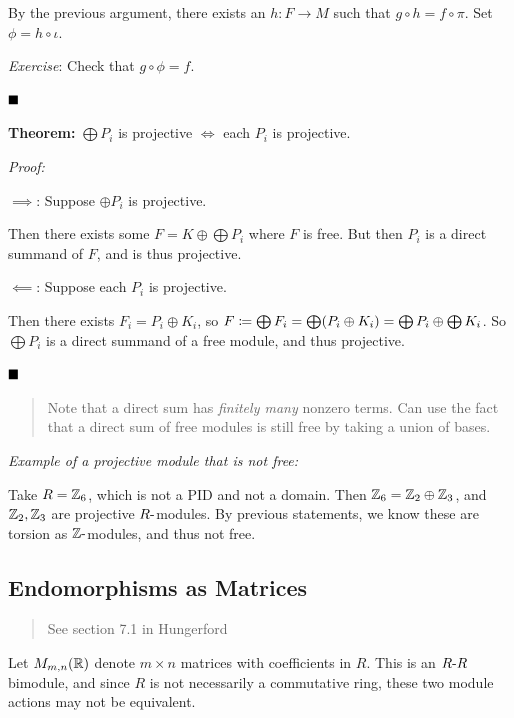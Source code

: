 By the previous argument, there exists an \(h: F\to M\) such that
\(g\circ h = f \circ \pi\). Set \(\phi = h\circ \iota\).

\emph{Exercise}: Check that \(g\circ \phi = f\).

\(\qed\)

\textbf{Theorem:} \(\bigoplus P_i\) is projective \(\iff\) each \(P_i\)
is projective.

\emph{Proof:}

\(\implies\): Suppose \(\oplus P_i\) is projective.

Then there exists some \(F = K \oplus \bigoplus P_i\) where \(F\) is
free. But then \(P_i\) is a direct summand of \(F\), and is thus
projective.

\(\impliedby\): Suppose each \(P_i\) is projective.

Then there exists \(F_i = P_i \oplus K_i\), so
\(F \coloneqq \bigoplus F_i = \bigoplus (P_i \oplus K_i) = \bigoplus P_i \oplus \bigoplus K_i\).
So \(\bigoplus P_i\) is a direct summand of a free module, and thus
projective.

\(\qed\)

\begin{quote}
Note that a direct sum has \emph{finitely many} nonzero terms. Can use
the fact that a direct sum of free modules is still free by taking a
union of bases.
\end{quote}

\emph{Example of a projective module that is not free:}

Take \(R = {\mathbb{Z}}_6\), which is not a PID and not a domain. Then
\({\mathbb{Z}}_6 = {\mathbb{Z}}_2 \oplus {\mathbb{Z}}_3\), and \({\mathbb{Z}}_2, {\mathbb{Z}}_3\) are projective
\(R{\hbox{-}}\)modules. By previous statements, we know these are torsion as
\({\mathbb{Z}}{\hbox{-}}\)modules, and thus not free.

\hypertarget{endomorphisms-as-matrices}{%
\subsection{Endomorphisms as Matrices}\label{endomorphisms-as-matrices}}

\begin{quote}
See section 7.1 in Hungerford
\end{quote}

Let \(M_{m, n}({\mathbb{R}})\) denote \(m\times n\) matrices with coefficients in
\(R\). This is an \(R{\hbox{-}} R\) bimodule, and since \(R\) is not
necessarily a commutative ring, these two module actions may not be
equivalent.


